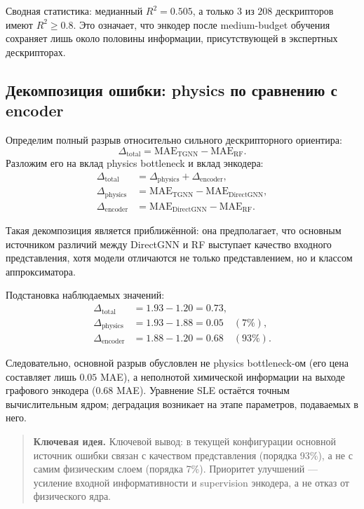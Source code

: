 \documentclass[11pt]{article}
\newcommand{\keyidea}[1]{\begin{quote}\textbf{Ключевая идея.} #1\end{quote}}
\begin{document}
Сводная статистика: медианный $R^2=0.505$, а только $3$ из $208$ дескрипторов имеют $R^2\ge 0.8$. Это означает, что энкодер после medium-budget обучения сохраняет лишь около половины информации, присутствующей в экспертных дескрипторах.

\subsection{Декомпозиция ошибки: physics по сравнению с encoder}
\label{subsec:error-decomposition}

Определим полный разрыв относительно сильного дескрипторного ориентира:
\begin{equation*}
\Delta_{\mathrm{total}} = \mathrm{MAE}_{\mathrm{TGNN}} - \mathrm{MAE}_{\mathrm{RF}}.
\end{equation*}
Разложим его на вклад physics bottleneck и вклад энкодера:
\begin{align*}
\Delta_{\mathrm{total}} &= \Delta_{\mathrm{physics}} + \Delta_{\mathrm{encoder}}, \\
\Delta_{\mathrm{physics}} &= \mathrm{MAE}_{\mathrm{TGNN}} - \mathrm{MAE}_{\mathrm{DirectGNN}}, \\
\Delta_{\mathrm{encoder}} &= \mathrm{MAE}_{\mathrm{DirectGNN}} - \mathrm{MAE}_{\mathrm{RF}}.
\end{align*}

Такая декомпозиция является приближённой: она предполагает, что основным источником различий между DirectGNN и RF выступает качество входного представления, хотя модели отличаются не только представлением, но и классом аппроксиматора.

Подстановка наблюдаемых значений:
\begin{align*}
\Delta_{\mathrm{total}} &= 1.93 - 1.20 = 0.73, \\
\Delta_{\mathrm{physics}} &= 1.93 - 1.88 = 0.05 \quad (7\%), \\
\Delta_{\mathrm{encoder}} &= 1.88 - 1.20 = 0.68 \quad (93\%).
\end{align*}

Следовательно, основной разрыв обусловлен не physics bottleneck-ом (его цена составляет лишь $0.05$ MAE), а неполнотой химической информации на выходе графового энкодера ($0.68$ MAE). Уравнение SLE остаётся точным вычислительным ядром; деградация возникает на этапе параметров, подаваемых в него.

\keyidea{Ключевой вывод: в текущей конфигурации основной источник ошибки связан с качеством представления (порядка 93\%), а не с самим физическим слоем (порядка 7\%). Приоритет улучшений --- усиление входной информативности и supervision энкодера, а не отказ от физического ядра.}
\end{document}
